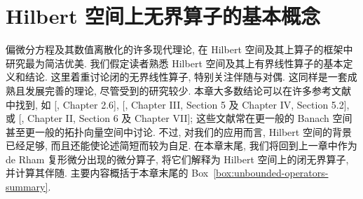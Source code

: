 \clearpage\setcounter{chapter}{2}
\chapter{Hilbert 空间上无界算子的基本概念}\label{chap:unbounded-operators}

偏微分方程及其数值离散化的许多现代理论, 在 Hilbert 空间及其上算子的框架中研究最为简洁优美. 我们假定读者熟悉 Hilbert 空间及其上有界线性算子的基本定义和结论. 这里着重讨论闭的无界线性算子, 特别关注伴随与对偶. 这同样是一套成熟且发展完善的理论, 尽管受到的研究较少. 本章大多数结论可以在许多参考文献中找到, 如 [, Chapter 2.6], [, Chapter III, Section 5 及 Chapter IV, Section 5.2], 或 [, Chapter II, Section 6 及 Chapter VII]; 这些文献常在更一般的 Banach 空间甚至更一般的拓扑向量空间中讨论. 不过, 对我们的应用而言, Hilbert 空间的背景已经足够, 而且还能使论述简短而较为自足. 在本章末尾, 我们将回到上一章中作为 de Rham 复形微分出现的微分算子, 将它们解释为 Hilbert 空间上的闭无界算子, 并计算其伴随. 主要内容概括于本章末尾的 Box~\ref{box:unbounded-operators-summary}.
